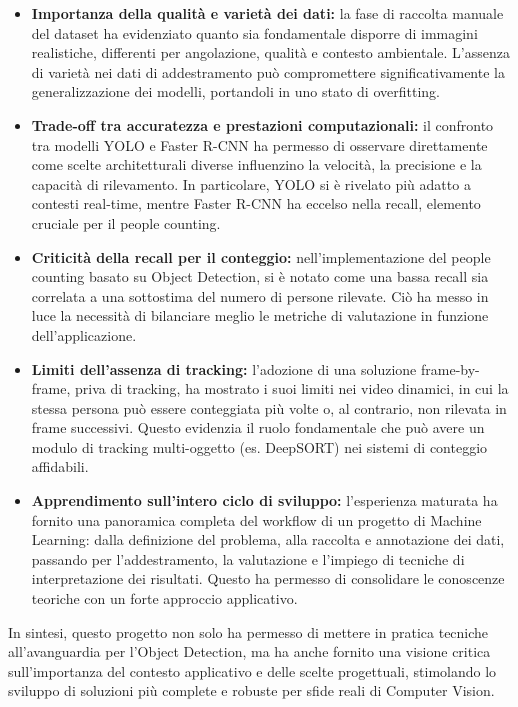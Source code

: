 \documentclass[12pt]{article}
\begin{document}
\begin{itemize}
    \item \textbf{Importanza della qualità e varietà dei dati:} la fase di raccolta manuale del dataset ha evidenziato quanto sia fondamentale disporre di immagini realistiche, differenti per angolazione, qualità e contesto ambientale. L’assenza di varietà nei dati di addestramento può compromettere significativamente la generalizzazione dei modelli, portandoli in uno stato di overfitting.

    \item \textbf{Trade-off tra accuratezza e prestazioni computazionali:} il confronto tra modelli YOLO e Faster R-CNN ha permesso di osservare direttamente come scelte architetturali diverse influenzino la velocità, la precisione e la capacità di rilevamento. In particolare, YOLO si è rivelato più adatto a contesti real-time, mentre Faster R-CNN ha eccelso nella recall, elemento cruciale per il people counting.

    \item \textbf{Criticità della recall per il conteggio:} nell’implementazione del people counting basato su Object Detection, si è notato come una bassa recall sia correlata a una sottostima del numero di persone rilevate. Ciò ha messo in luce la necessità di bilanciare meglio le metriche di valutazione in funzione dell’applicazione.

    \item \textbf{Limiti dell’assenza di tracking:} l’adozione di una soluzione frame-by-frame, priva di tracking, ha mostrato i suoi limiti nei video dinamici, in cui la stessa persona può essere conteggiata più volte o, al contrario, non rilevata in frame successivi. Questo evidenzia il ruolo fondamentale che può avere un modulo di tracking multi-oggetto (es. DeepSORT) nei sistemi di conteggio affidabili.

    \item \textbf{Apprendimento sull’intero ciclo di sviluppo:} l’esperienza maturata ha fornito una panoramica completa del workflow di un progetto di Machine Learning: dalla definizione del problema, alla raccolta e annotazione dei dati, passando per l’addestramento, la valutazione e l’impiego di tecniche di interpretazione dei risultati. Questo ha permesso di consolidare le conoscenze teoriche con un forte approccio applicativo.

\end{itemize}
In sintesi, questo progetto non solo ha permesso di mettere in pratica tecniche all'avanguardia per l’Object Detection, ma ha anche fornito una visione critica sull’importanza del contesto applicativo e delle scelte progettuali, stimolando lo sviluppo di soluzioni più complete e robuste per sfide reali di Computer Vision.
\end{document}
